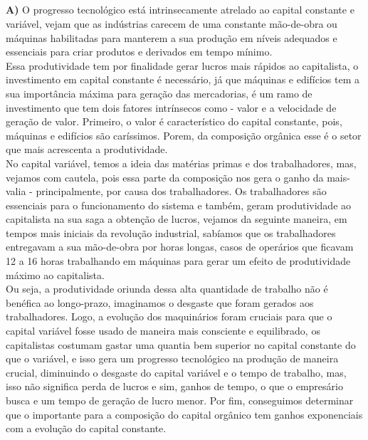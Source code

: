 \documentclass[a4paper, 12pt]{article} %
\begin{document}
\subparagraph{} \textbf{A)} O progresso tecnológico está intrinsecamente atrelado ao capital constante e variável, vejam que as indústrias carecem de uma constante mão-de-obra ou máquinas habilitadas para manterem a sua produção em níveis adequados e essenciais para criar produtos e derivados em tempo mínimo.
\\
Essa produtividade tem por finalidade gerar lucros mais rápidos ao capitalista, o investimento em capital constante é necessário, já que máquinas e edifícios tem a sua importância máxima para geração das mercadorias, é um ramo de investimento que tem dois fatores intrínsecos como - valor e a velocidade de geração de valor. Primeiro, o valor é característico do capital constante, pois, máquinas e edifícios são caríssimos. Porem, da composição orgânica esse é o setor que mais acrescenta a produtividade. 
\\
No capital variável, temos a ideia das matérias primas e dos trabalhadores, mas, vejamos com cautela, pois essa parte da composição nos gera o ganho da mais-valia - principalmente, por causa dos trabalhadores. Os trabalhadores são essenciais para o funcionamento do sistema e também, geram produtividade ao capitalista na sua saga a obtenção de lucros, vejamos da seguinte maneira, em tempos mais iniciais da revolução industrial, sabíamos que os trabalhadores entregavam a sua mão-de-obra por horas longas, casos de operários que ficavam 12 a 16 horas trabalhando em máquinas para gerar um efeito de produtividade máximo ao capitalista.
\\
Ou seja, a produtividade oriunda dessa alta quantidade de trabalho não é benéfica ao longo-prazo, imaginamos o desgaste que foram gerados aos trabalhadores. Logo, a evolução dos maquinários foram cruciais para que o capital variável fosse usado de maneira mais consciente e equilibrado, os capitalistas costumam gastar uma quantia bem superior no capital constante do que o variável, e isso gera um progresso tecnológico na produção de maneira crucial, diminuindo o desgaste do capital variável e o tempo de trabalho, mas, isso não significa perda de lucros e sim, ganhos de tempo, o que o empresário busca e um tempo de geração de lucro menor. Por fim, conseguimos determinar que o importante para a composição do capital orgânico tem ganhos exponenciais com a evolução do capital constante.

\vspace{0.5cm}
\end{document}
